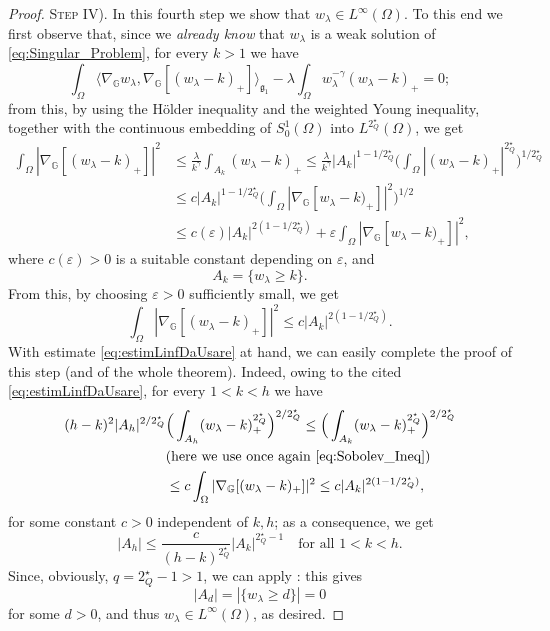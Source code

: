\documentclass[11pt]{amsart}
\numberwithin{equation}{section} %
\theoremstyle{definition}
\begin{document}
\begin{proof}
			 \textsc{Step IV).} In this fourth step we show that $w_\lambda\in L^\infty(\Omega)$.
			 To this end we first observe that, since we \emph{already know} that
			 $w_\lambda$ is a weak solution
			 of \eqref{eq:Singular_Problem}, for every $k> 1$ we have
			 $$
			 \int_{\Omega}
			  \langle\nabla_\mathbb{G}w_\lambda,\nabla_\mathbb{G}[(w_\lambda-k)_+]\rangle_{\mathfrak{g}_{1}}
			  -\lambda\int_{\Omega}w_\lambda^{-\gamma}(w_\lambda-k)_+ = 0;$$
			  from this, by using the H\"older inequality and the weighted Young inequality, together
			  with the continuous embedding of $S_0^1(\Omega)$ into $L^{2_Q^\star}(\Omega)$, we get
	\begin{align*}
	 \int_{\Omega}
			  |\nabla_\mathbb{G}[(w_\lambda-k)_+]|^2 & \leq
			   \frac{\lambda}{k^\gamma}\int_{A_k}(w_\lambda-k)_+
		\leq \frac{\lambda}{k^\gamma}|A_k|^{1-1/2_Q^\star}
		\Big(\int_{\Omega}|(w_\lambda-k)_+|^{2_Q^\star}\Big)^{1/2_Q^\star} \\
		& \leq c|A_k|^{1-1/2_Q^\star}\Big(\int_{\Omega}|\nabla_\mathbb{G}[w_\lambda-k)_+]|^{2}\Big)^{1/2}
		\\
		& \leq
		c(\varepsilon) |A_k|^{2(1-1/2_Q^\star)}+\varepsilon\int_{\Omega}|\nabla_\mathbb{G}[w_\lambda-k)_+]|^{2},
	\end{align*}
	where $c(\varepsilon) > 0$ is a suitable constant depending on $\varepsilon$, and
	$$A_k = \{w_\lambda\geq k\}.$$
	From this, by choosing $\varepsilon > 0$ sufficiently small, we get
	\begin{equation} \label{eq:estimLinfDaUsare}
	 \int_{\Omega}
			  |\nabla_\mathbb{G}[(w_\lambda-k)_+]|^2
			  \leq c |A_k|^{2(1-1/2_Q^\star)}.
	\end{equation}
	With estimate \eqref{eq:estimLinfDaUsare} at hand, 
	we can easily complete the proof of this step (and of the  whole
	theorem). Indeed, owing to the cited \eqref{eq:estimLinfDaUsare}, for every
	$1< k < h$ we have
	\begin{align*}
	 (h-k)^{2}|A_h|^{2/2_Q^\star}
	 & \Big(\int_{A_h}(w_\lambda-k)_+^{2_Q^\star}\Big)^{2/2_Q^\star}
	 \leq \Big(\int_{A_k}(w_\lambda-k)_+^{2_Q^\star}\Big)^{2/2_Q^\star} \\
	 & (\text{here we use once again \eqref{eq:Sobolev_Ineq}}) \\
	 & \leq c\int_{\Omega}
			  |\nabla_\mathbb{G}[(w_\lambda-k)_+]|^2\leq 
			  c |A_k|^{2(1-1/2_Q^\star)},
	\end{align*}
	for some constant $c > 0$ independent of $k,h$; as a consequence, we get
	$$|A_h|\leq \frac{c}{(h-k)^{2_Q^\star}}|A_k|^{2_Q^\star-1}\quad\text{for all $1< k < h$}.$$
	Since, obviously, $q = 2_Q^\star-1 > 1$, we can apply \cite[Lemma B.1]{KS}: this gives
	$$|A_{d}| = |\{w_\lambda\geq d\}| = 0$$
	for some $d > 0$, and thus $w_\lambda\in L^\infty(\Omega)$, as desired.
	\medskip
	

\end{proof}
\end{document}
